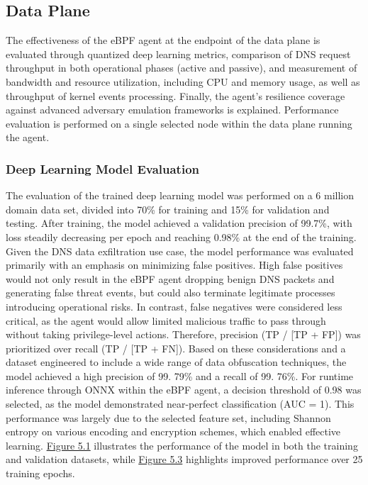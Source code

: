 \documentclass [11pt, proquest] {uwthesis}[2020/02/24]
\begin{document}
\subsection{Data Plane}
The effectiveness of the eBPF agent at the endpoint of the data plane is evaluated through quantized deep learning metrics, comparison of DNS request throughput in both operational phases (active and passive), and measurement of bandwidth and resource utilization, including CPU and memory usage, as well as throughput of kernel events processing. Finally, the agent’s resilience coverage against advanced adversary emulation frameworks is explained. Performance evaluation is performed on a single selected node within the data plane running the agent.

\subsubsection{Deep Learning Model Evaluation}
The evaluation of the trained deep learning model was performed on a 6 million domain data set, divided into 70\% for training and 15\% for validation and testing. After training, the model achieved a validation precision of 99.7\%, with loss steadily decreasing per epoch and reaching 0.98\% at the end of the training. Given the DNS data exfiltration use case, the model performance was evaluated primarily with an emphasis on minimizing false positives. High false positives would not only result in the eBPF agent dropping benign DNS packets and generating false threat events, but could also terminate legitimate processes introducing operational risks. In contrast, false negatives were considered less critical, as the agent would allow limited malicious traffic to pass through without taking privilege-level actions. Therefore, precision (TP / [TP + FP]) was prioritized over recall (TP / [TP + FN]). Based on these considerations and a dataset engineered to include a wide range of data obfuscation techniques, the model achieved a high precision of 99. 79\% and a recall of 99. 76\%. For runtime inference through ONNX within the eBPF agent, a decision threshold of 0.98 was selected, as the model demonstrated near-perfect classification (AUC = 1). This performance was largely due to the selected feature set, including Shannon entropy on various encoding and encryption schemes, which enabled effective learning. \hyperref[model-evaluation-metrics]{Figure 5.1} illustrates the performance of the model in both the training and validation datasets, while \hyperref[fig:model_metrics_quadrant]{Figure 5.3} highlights improved performance over 25 training epochs.
\end{document}

